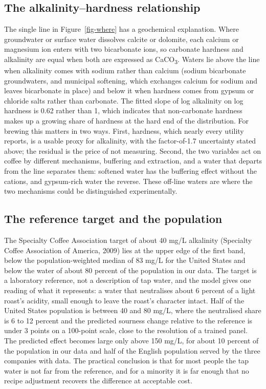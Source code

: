 \documentclass[
  a4paper,
]{article}
\begin{document}
\subsection{The alkalinity--hardness
relationship}\label{the-alkalinityhardness-relationship}

The single line in Figure~\ref{fig-where} has a geochemical explanation.
Where groundwater or surface water dissolves calcite or dolomite, each
calcium or magnesium ion enters with two bicarbonate ions, so carbonate
hardness and alkalinity are equal when both are expressed as
CaCO\textsubscript{3}. Waters lie above the line when alkalinity comes
with sodium rather than calcium (sodium bicarbonate groundwaters, and
municipal softening, which exchanges calcium for sodium and leaves
bicarbonate in place) and below it when hardness comes from gypsum or
chloride salts rather than carbonate. The fitted slope of log alkalinity
on log hardness is 0.62 rather than 1, which indicates that
non-carbonate hardness makes up a growing share of hardness at the hard
end of the distribution. For brewing this matters in two ways. First,
hardness, which nearly every utility reports, is a usable proxy for
alkalinity, with the factor-of-1.7 uncertainty stated above; the
residual is the price of not measuring. Second, the two variables act on
coffee by different mechanisms, buffering and extraction, and a water
that departs from the line separates them: softened water has the
buffering effect without the cations, and gypsum-rich water the reverse.
These off-line waters are where the two mechanisms could be
distinguished experimentally.

\subsection{The reference target and the
population}\label{the-reference-target-and-the-population}

The Specialty Coffee Association target of about 40 mg/L alkalinity
(Specialty Coffee Association of America, 2009) lies at the upper edge
of the first band, below the population-weighted median of 83 mg/L for
the United States and below the water of about 80 percent of the
population in our data. The target is a laboratory reference, not a
description of tap water, and the model gives one reading of what it
represents: a water that neutralises about 6 percent of a light roast's
acidity, small enough to leave the roast's character intact. Half of the
United States population is between 40 and 80 mg/L, where the
neutralised share is 6 to 12 percent and the predicted sourness change
relative to the reference is under 3 points on a 100-point scale, close
to the resolution of a trained panel. The predicted effect becomes large
only above 150 mg/L, for about 10 percent of the population in our data
and half of the English population served by the three companies with
data. The practical conclusion is that for most people the tap water is
not far from the reference, and for a minority it is far enough that no
recipe adjustment recovers the difference at acceptable cost.
\end{document}
